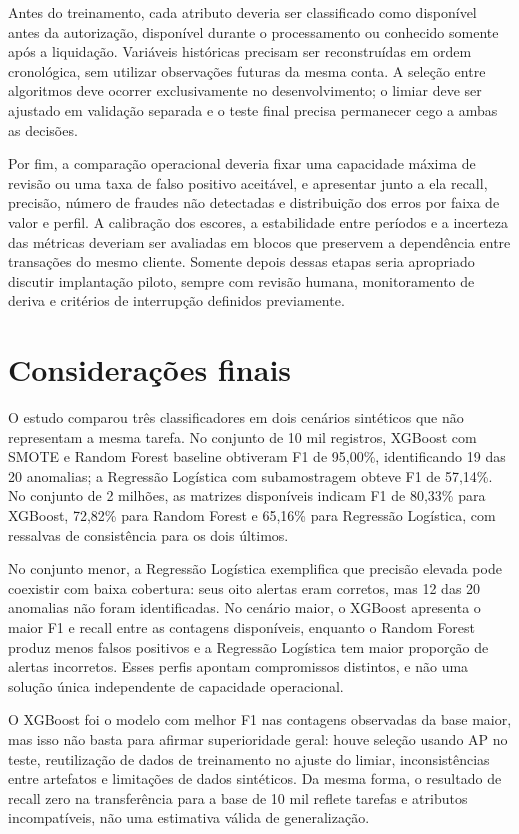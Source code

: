 \documentclass[11pt,a4paper]{article}
\begin{document}
Antes do treinamento, cada atributo deveria ser classificado como disponível antes da autorização, disponível durante o processamento ou conhecido somente após a liquidação. Variáveis históricas precisam ser reconstruídas em ordem cronológica, sem utilizar observações futuras da mesma conta. A seleção entre algoritmos deve ocorrer exclusivamente no desenvolvimento; o limiar deve ser ajustado em validação separada e o teste final precisa permanecer cego a ambas as decisões.

Por fim, a comparação operacional deveria fixar uma capacidade máxima de revisão ou uma taxa de falso positivo aceitável, e apresentar junto a ela recall, precisão, número de fraudes não detectadas e distribuição dos erros por faixa de valor e perfil. A calibração dos escores, a estabilidade entre períodos e a incerteza das métricas deveriam ser avaliadas em blocos que preservem a dependência entre transações do mesmo cliente. Somente depois dessas etapas seria apropriado discutir implantação piloto, sempre com revisão humana, monitoramento de deriva e critérios de interrupção definidos previamente.

\section{Considerações finais}

O estudo comparou três classificadores em dois cenários sintéticos que não representam a mesma tarefa. No conjunto de 10 mil registros, XGBoost com SMOTE e Random Forest baseline obtiveram F1 de 95,00\%, identificando 19 das 20 anomalias; a Regressão Logística com subamostragem obteve F1 de 57,14\%. No conjunto de 2 milhões, as matrizes disponíveis indicam F1 de 80,33\% para XGBoost, 72,82\% para Random Forest e 65,16\% para Regressão Logística, com ressalvas de consistência para os dois últimos.

No conjunto menor, a Regressão Logística exemplifica que precisão elevada pode coexistir com baixa cobertura: seus oito alertas eram corretos, mas 12 das 20 anomalias não foram identificadas. No cenário maior, o XGBoost apresenta o maior F1 e recall entre as contagens disponíveis, enquanto o Random Forest produz menos falsos positivos e a Regressão Logística tem maior proporção de alertas incorretos. Esses perfis apontam compromissos distintos, e não uma solução única independente de capacidade operacional.

O XGBoost foi o modelo com melhor F1 nas contagens observadas da base maior, mas isso não basta para afirmar superioridade geral: houve seleção usando AP no teste, reutilização de dados de treinamento no ajuste do limiar, inconsistências entre artefatos e limitações de dados sintéticos. Da mesma forma, o resultado de recall zero na transferência para a base de 10 mil reflete tarefas e atributos incompatíveis, não uma estimativa válida de generalização.
\end{document}
